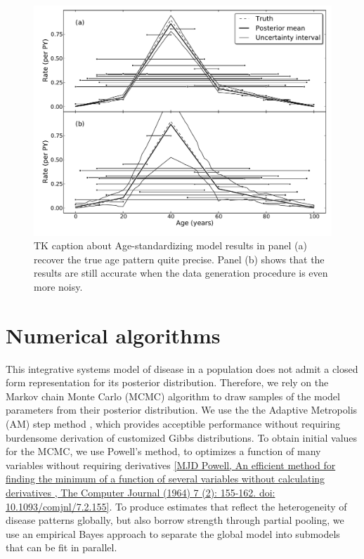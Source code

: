 \documentclass[12pt]{article}
\newcommand{\1}{\mathbf{1}}
\newcommand{\0}{\mathbf{0}}
\begin{document}
\begin{figure}[h]
\begin{center}
\includegraphics[width=\textwidth]{age_group_standardize.pdf}
\caption{TK caption about Age-standardizing model results in panel (a)
  recover the true age pattern quite precise. Panel (b) shows that the
  results are still accurate when the data generation procedure is
  even more noisy.}
\label{age-group-standardize}
\end{center}
\end{figure}


\section{Numerical algorithms}
\label{na}
This integrative systems model of disease in a population does not
admit a closed form representation for its posterior distribution.
Therefore, we rely on the Markov chain Monte Carlo (MCMC) algorithm to
draw samples of the model parameters from their posterior
distribution.  We use the the Adaptive Metropolis (AM) step method
\cite{Haario_Adaptive_2001}, which provides acceptible performance
without requiring burdensome derivation of customized Gibbs
distributions. To obtain initial values for the MCMC, we use Powell's
method, to optimizes a function of many variables without requiring
derivatives \ref{MJD Powell, An efficient method for finding the
  minimum of a function of several variables without calculating
  derivatives , The Computer Journal (1964) 7 (2): 155-162.  doi:
  10.1093/comjnl/7.2.155}.  To produce estimates that reflect the
heterogeneity of disease patterns globally, but also borrow strength
through partial pooling, we use an empirical Bayes approach to
separate the global model into submodels that can be fit in parallel.
\end{document}
